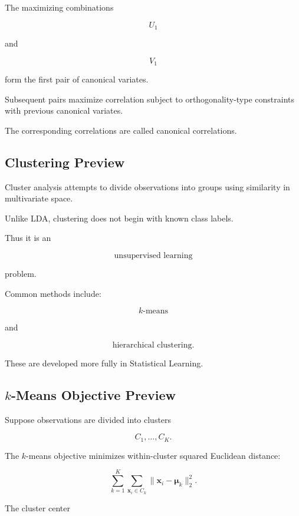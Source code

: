 The maximizing combinations

\[
U_1
\]

and

\[
V_1
\]

form the first pair of canonical variates.

Subsequent pairs maximize correlation subject to orthogonality-type
constraints with previous canonical variates.

The corresponding correlations are called canonical correlations.

\subsection{Clustering Preview}
\label{subsec:multivariate-clustering-preview}

Cluster analysis attempts to divide observations into groups using
similarity in multivariate space.

Unlike LDA, clustering does not begin with known class labels.

Thus it is an

\[
\boxed{
\text{unsupervised learning}
}
\]

problem.

Common methods include:

\[
\boxed{
k\text{-means}
}
\]

and

\[
\boxed{
\text{hierarchical clustering}.
}
\]

These are developed more fully in Statistical Learning.

\subsection{\(k\)-Means Objective Preview}
\label{subsec:kmeans-preview}

Suppose observations are divided into clusters

\[
C_1,\ldots,C_K.
\]

The \(k\)-means objective minimizes within-cluster squared Euclidean
distance:

\[
\boxed{
\sum_{k=1}^{K}
\sum_{\mathbf{x}_i\in C_k}
\|
\mathbf{x}_i
-
\boldsymbol{\mu}_k
\|_2^2.
}
\]

The cluster center


